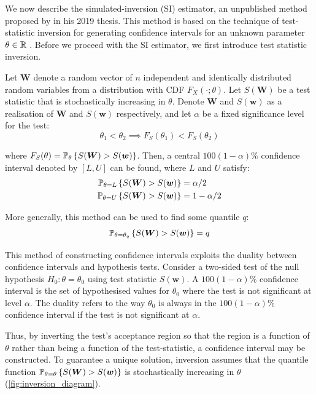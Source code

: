 We now describe the simulated-inversion (SI) estimator, an unpublished method proposed by \citet{Huang2019} in his 2019 thesis. This method is based on the technique of test-statistic inversion for generating confidence intervals for an unknown parameter $\theta \in \mathbb{R}$ \cite{Carpenter1999}. Before we proceed with the SI estimator, we first introduce test statistic inversion.

Let $\bm{W}$ denote a random vector of $n$ independent and identically distributed random variables from a distribution with CDF $F_X (\cdot; \theta)$. Let $S(\bm{W})$ be a test statistic that is stochastically increasing in $\theta$. Denote $\bm{W}$ and $S(\bm{w})$ as a realisation of $\bm{W}$ and $S(\bm{w})$ respectively, and let $\alpha$ be a fixed significance level for the test:
\begin{equation}
    \theta_1 < \theta_2 \implies F_S(\theta_1) < F_S(\theta_2) 
\end{equation}

where $F_S(\theta) = \mathbb{P}_\theta\left\{S(\bm{W}) > S(\bm{w})\right\}$. Then, a central $100(1-\alpha)\%$ confidence interval denoted by $[L, U]$ can be found, where $L$ and $U$ satisfy: \begin{equation}
\begin{aligned}
    \mathbb{P}_{\theta = L}\left\{S(\bm{W}) > S(\bm{w})\right\} &= \alpha/2 \\
    \mathbb{P}_{\theta = U}\left\{S(\bm{W}) > S(\bm{w})\right\} &= 1 - \alpha/2
\end{aligned}
\end{equation}

More generally, this method can be used to find some quantile $q$: \begin{equation}\label{eq: inversion}
    \mathbb{P}_{\theta = \theta_q}\left\{S(\bm{W}) > S(\bm{w})\right\} = q
\end{equation}

This method of constructing confidence intervals exploits the duality between confidence intervals and hypothesis tests. Consider a two-sided test of the null hypothesis $H_0: \theta = \theta_0$ using test statistic $S(\bm{w})$. A $100(1-\alpha)\%$ confidence interval is the set of hypothesised values for $\theta_0$ where the test is not significant at level $\alpha$. The duality refers to the way $\theta_0$ is always in the $100(1-\alpha)\%$ confidence interval if the test is not significant at $\alpha$.

Thus, by inverting the test's acceptance region so that the region is a function of $\theta$ rather than being a function of the test-statistic, a confidence interval may be constructed. To guarantee a unique solution, inversion assumes that the quantile function $\mathbb{P}_{\theta = \theta}\left\{S(\bm{W}) > S(\bm{w})\right\}$ is stochastically increasing in $\theta$ (\autoref{fig:inversion_diagram}).

